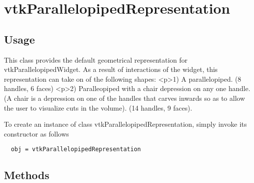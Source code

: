 \section{vtkParallelopipedRepresentation}

\subsection{Usage}

 This class provides the default geometrical representation for 
 vtkParallelopipedWidget. As a result of interactions of the widget, this
 representation can take on of the following shapes:
 <p>1) A parallelopiped. (8 handles, 6 faces)
 <p>2) Paralleopiped with a chair depression on any one handle. (A chair
 is a depression on one of the handles that carves inwards so as to allow 
 the user to visualize cuts in the volume). (14 handles, 9 faces).


To create an instance of class vtkParallelopipedRepresentation, simply
invoke its constructor as follows
\begin{verbatim}
  obj = vtkParallelopipedRepresentation
\end{verbatim}
\subsection{Methods}

